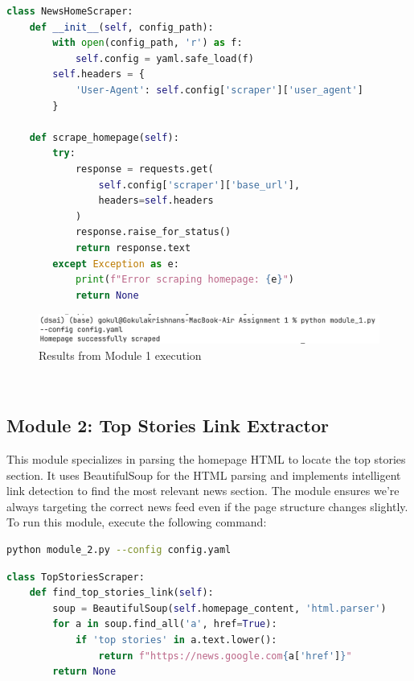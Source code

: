 \documentclass{article}
\begin{document}
\begin{lstlisting}[language=Python]
class NewsHomeScraper:
    def __init__(self, config_path):
        with open(config_path, 'r') as f:
            self.config = yaml.safe_load(f)
        self.headers = {
            'User-Agent': self.config['scraper']['user_agent']
        }

    def scrape_homepage(self):
        try:
            response = requests.get(
                self.config['scraper']['base_url'], 
                headers=self.headers
            )
            response.raise_for_status()
            return response.text
        except Exception as e:
            print(f"Error scraping homepage: {e}")
            return None
\end{lstlisting}

\begin{figure}[H]
    \centering
    \includegraphics[width=\textwidth]{report/module_1 results.png}
    \caption{Results from Module 1 execution}
    \label{fig:module1-results}
\end{figure}

\\

\subsection{Module 2: Top Stories Link Extractor}
This module specializes in parsing the homepage HTML to locate the top stories section. It uses BeautifulSoup for the HTML parsing and implements intelligent link detection to find the most relevant news section. The module ensures we're always targeting the correct news feed even if the page structure changes slightly.
To run this module, execute the following command:
\begin{lstlisting}[language=bash]
python module_2.py --config config.yaml
\end{lstlisting}
\begin{lstlisting}[language=Python]
class TopStoriesScraper:
    def find_top_stories_link(self):
        soup = BeautifulSoup(self.homepage_content, 'html.parser')
        for a in soup.find_all('a', href=True):
            if 'top stories' in a.text.lower():
                return f"https://news.google.com{a['href']}"
        return None
\end{lstlisting}
\end{document}
